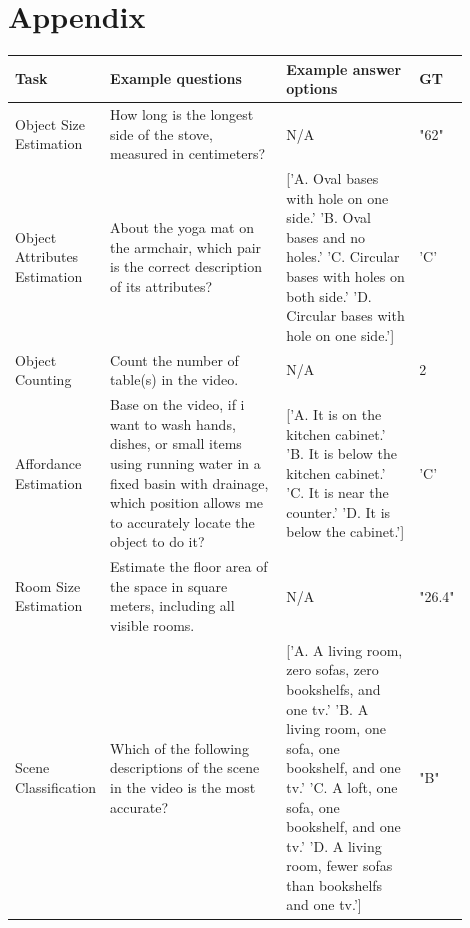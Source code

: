 \documentclass{article}
\begin{document}





\newpage
\appendix


\section*{Appendix}



\begin{table}[ht]
    \centering
   \scriptsize
    \begin{tabular}{p{0.15\linewidth} | p{0.4\linewidth} | p{0.3\linewidth} | p{0.05\linewidth}  }
      \toprule 
      \textbf{Task}  & \textbf{Example questions} & \textbf{Example answer options} & \textbf{GT}\\
      \hline
      \hline
      Object Size Estimation   & How long is the longest side of the stove, measured in centimeters? & N/A & "62" \\
      \hline
      Object Attributes Estimation   & About the yoga mat on the armchair, which pair is the correct description of its attributes?   & ['A. Oval bases with hole on one side.' 'B. Oval bases and no holes.' 'C. Circular bases with holes on both side.' 'D. Circular bases with hole on one side.'] &  'C' \\
      \hline
      Object Counting   & Count the number of table(s) in the video. & N/A & 2 \\
      \hline
       Affordance Estimation   & Base on the video, if i want to wash hands, dishes, or small items using running water in a fixed basin with drainage, which position allows me to accurately locate the object to do it?   & ['A. It is on the kitchen cabinet.' 'B. It is below the kitchen cabinet.' 'C. It is near the counter.' 'D. It is below the cabinet.'] & 'C' \\
      \hline  
      Room Size Estimation   & Estimate the floor area of the space in square meters, including all visible rooms. & N/A & "26.4" \\
      \hline 
      Scene Classification   & Which of the following descriptions of the scene in the video is the most accurate? & ['A. A living room, zero sofas, zero bookshelfs, and one tv.' 'B. A living room, one sofa, one bookshelf, and one tv.' 'C. A loft, one sofa, one bookshelf, and one tv.' 'D. A living room, fewer sofas than bookshelfs and one tv.'] & "B" \\

\end{tabular}
\end{table}
\end{document}
